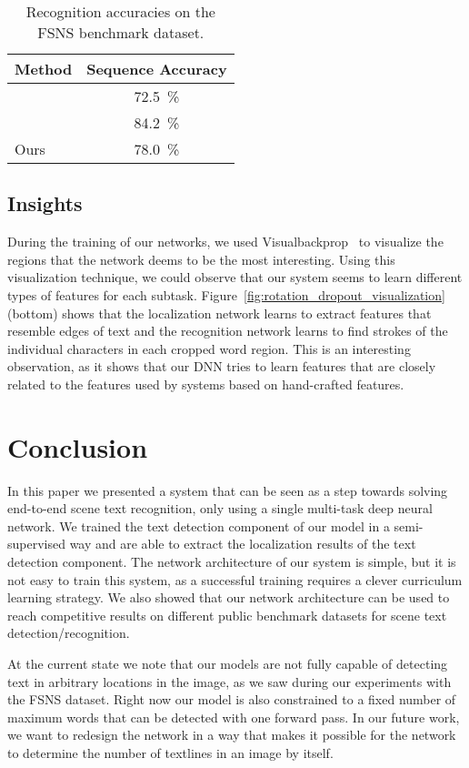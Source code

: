 \documentclass[letterpaper]{article}
\begin{document}
	\begin{table}
		\centering
		\begin{tabular}{|l|c|}
			\hline
			Method & Sequence Accuracy \\
			\hline
			\cite{Smith2016EndToEnd} & \SI{72.5}{\percent} \\
			\cite{Wojna2017AttentionBased} & \SI{84.2}{\percent} \\
			\hline
			Ours & \SI{78.0}{\percent} \\
			\hline
		\end{tabular}
		\caption{Recognition accuracies on the \ac{FSNS} benchmark dataset.}
		\label{tab:fsns_results}
	\end{table}

	\subsection{Insights}

	During the training of our networks, we used Visualbackprop~\cite{Bojarski2016Visualbackprop} to visualize the regions that the network deems to be the most interesting.
	Using this visualization technique, we could observe that our system seems to learn different types of features for each subtask.
	Figure~\ref{fig:rotation_dropout_visualization} (bottom) shows that the localization network learns to extract features that resemble edges of text and the recognition network learns to find strokes of the individual characters in each cropped word region.
	This is an interesting observation, as it shows that our \ac{DNN} tries to learn features that are closely related to the features used by systems based on hand-crafted features.


	\section{Conclusion}
	\label{sec:conclusion}

	In this paper we presented a system that can be seen as a step towards solving end-to-end scene text recognition, only using a single multi-task deep neural network.
	We trained the text detection component of our model in a semi-supervised way and are able to extract the localization results of the text detection component.
	The network architecture of our system is simple, but it is not easy to train this system, as a successful training requires a clever curriculum learning strategy.
	We also showed that our network architecture can be used to reach competitive results on different public benchmark datasets for scene text detection/recognition.

	At the current state we note that our models are not fully capable of detecting text in arbitrary locations in the image, as we saw during our experiments with the \ac{FSNS} dataset.
	Right now our model is also constrained to a fixed number of maximum words that can be detected with one forward pass. In our future work, we want to redesign the network in a way that makes it possible for the network to determine the number of textlines in an image by itself.

	\fontsize{9.5pt}{10.5pt}
	\selectfont
	
	
\end{document}
